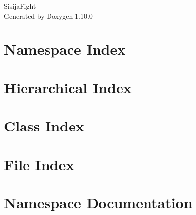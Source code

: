 \documentclass[twoside]{book}
\newcommand{\+}{\discretionary{\mbox{\scriptsize$\hookleftarrow$}}{}{}}
\newcommand{\clearemptydoublepage}{%
    \newpage{\pagestyle{empty}\cleardoublepage}%
  }
\begin{document}
  \raggedbottom
    \hypersetup{pageanchor=false,
                bookmarksnumbered=true,
                pdfencoding=unicode
               }
  \begin{titlepage}
  \vspace*{7cm}
  \begin{center}%
  {\Large Sisija\+Fight}\\
  \vspace*{1cm}
  {\large Generated by Doxygen 1.10.0}\\
  \end{center}
  \end{titlepage}
  \clearemptydoublepage
  \tableofcontents
  \clearemptydoublepage
  \hypersetup{pageanchor=true}

\chapter{Namespace Index}

\chapter{Hierarchical Index}

\chapter{Class Index}

\chapter{File Index}

\chapter{Namespace Documentation}

\end{document}
